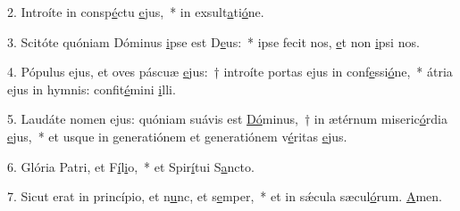 2. Introíte in consp\uline{é}ctu \uline{e}jus,~* in exsult\uline{a}ti\uline{ó}ne.\par 
3. Scitóte quóniam Dóminus \uline{i}pse est D\uline{e}us:~* ipse fecit nos, \uline{e}t non \uline{i}psi nos.\par 
4. Pópulus ejus, et oves páscuæ \uline{e}jus:~† introíte portas ejus in conf\uline{e}ssi\uline{ó}ne,~* átria ejus in hymnis: confit\uline{é}mini \uline{i}lli.\par 
5. Laudáte nomen ejus: quóniam suávis est \uline{Dó}minus,~† in ætérnum miseric\uline{ó}rdia \uline{e}jus,~* et usque in generatiónem et generatiónem v\uline{é}ritas \uline{e}jus.\par 
6. Glória Patri, et F\uline{í}l\uline{i}o,~* et Spir\uline{í}tui S\uline{a}ncto.\par 
7. Sicut erat in princípio, et n\uline{u}nc, et s\uline{e}mper,~* et in sǽcula sæcul\uline{ó}rum. \uline{A}men.\par 
